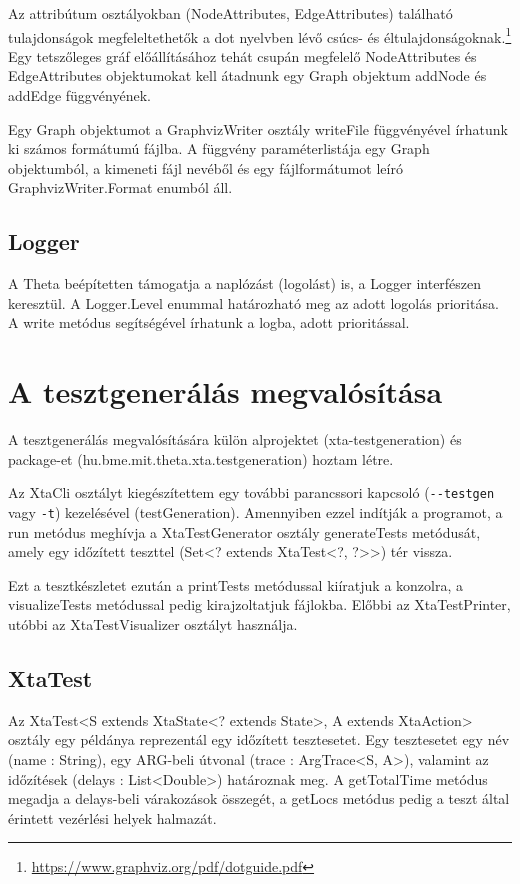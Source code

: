 Az attribútum osztályokban (\textsf{NodeAttributes, EdgeAttributes}) található tulajdonságok megfeleltethetők a dot nyelvben lévő csúcs- és éltulajdonságoknak.\footnote{\url{https://www.graphviz.org/pdf/dotguide.pdf}} Egy tetszőleges gráf előállításához tehát csupán megfelelő \textsf{NodeAttributes} és \textsf{EdgeAttributes} objektumokat kell átadnunk egy \textsf{Graph} objektum \textsf{addNode} és \textsf{addEdge} függvényének.

Egy \textsf{Graph} objektumot a \textsf{GraphvizWriter} osztály \textsf{writeFile} függvényével írhatunk ki számos formátumú fájlba. A függvény paraméterlistája egy \textsf{Graph} objektumból, a kimeneti fájl nevéből és egy fájlformátumot leíró \textsf{GraphvizWriter.Format} enumból áll.

\subsection{Logger}
A Theta beépítetten támogatja a naplózást (logolást) is, a \textsf{Logger} interfészen keresztül. A \textsf{Logger.Level} enummal határozható meg az adott logolás prioritása. A \textsf{write} metódus segítségével írhatunk a logba, adott prioritással.

\section{A tesztgenerálás megvalósítása} \label{megvalositas}

A tesztgenerálás megvalósítására külön alprojektet (\textsf{xta-testgeneration}) és package-et (\textsf{hu.bme.mit.theta.xta.testgeneration}) hoztam létre.

Az \textsf{XtaCli} osztályt kiegészítettem egy további parancssori kapcsoló (\texttt{-{}-testgen} vagy \texttt{-t}) kezelésével (\textsf{testGeneration}). Amennyiben ezzel indítják a programot, a \textsf{run} metódus meghívja a \textsf{XtaTestGenerator} osztály \textsf{generateTests} metódusát, amely egy időzített teszttel (\textsf{Set<? extends XtaTest<?, ?>{}>}) tér vissza.

Ezt a tesztkészletet ezután a \textsf{printTests} metódussal kiíratjuk a konzolra, a \textsf{visualizeTests} metódussal pedig kirajzoltatjuk fájlokba. Előbbi az \textsf{XtaTestPrinter}, utóbbi az \textsf{XtaTestVisualizer} osztályt használja.

\subsection{XtaTest}
Az \textsf{XtaTest<S extends XtaState<? extends State>, A extends XtaAction>} osztály egy példánya reprezentál egy időzített tesztesetet. Egy tesztesetet egy név (\textsf{name : String}), egy ARG-beli útvonal (\textsf{trace : ArgTrace<S, A>}), valamint az időzítések (\textsf{delays : List<Double>}) határoznak meg. A \textsf{getTotalTime} metódus megadja a \textsf{delays}-beli várakozások összegét, a \textsf{getLocs} metódus pedig a teszt által érintett vezérlési helyek halmazát.

